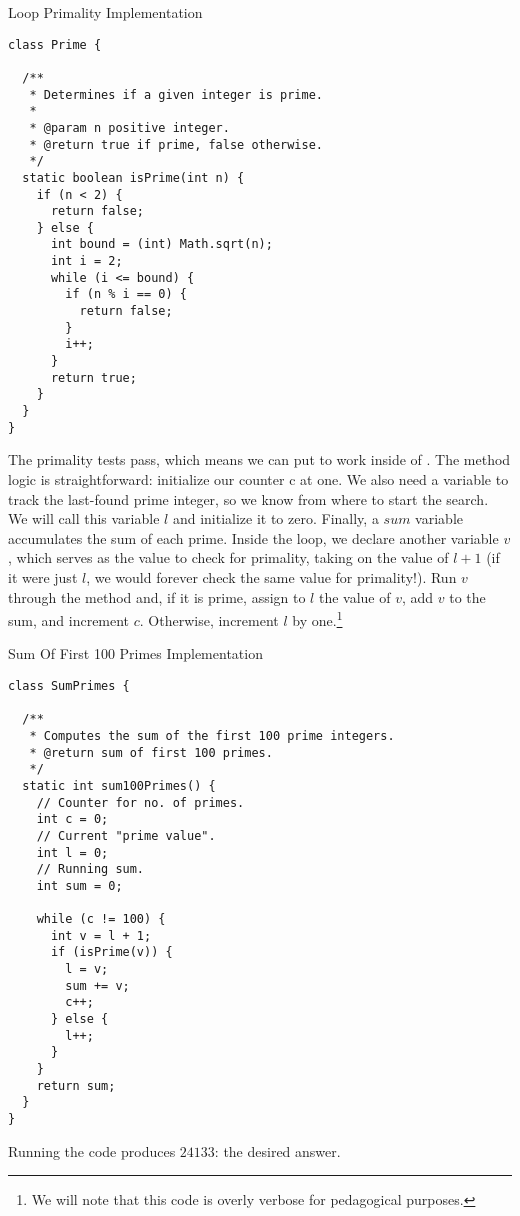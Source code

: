 \begin{cl}{Loop Primality Implementation}
\begin{lstlisting}[language=MyJava]
class Prime {

  /**
   * Determines if a given integer is prime.
   * 
   * @param n positive integer.
   * @return true if prime, false otherwise.
   */
  static boolean isPrime(int n) {
    if (n < 2) { 
      return false;
    } else {
      int bound = (int) Math.sqrt(n);
      int i = 2;
      while (i <= bound) {
        if (n % i == 0) {
          return false;
        }
        i++;
      }
      return true;
    }
  }
}
\end{lstlisting}
\end{cl}

The primality tests pass, which means we can put  to work inside of . The method logic is straightforward: initialize our counter c at one. We also need a variable to track the last-found prime integer, so we know from where to start the search. We will call this variable $l$ and initialize it to zero. Finally, a $\mathit{sum}$ variable accumulates the sum of each prime. Inside the loop, we declare another variable $v$, which serves as the value to check for primality, taking on the value of $l + 1$ (if it were just $l$, we would forever check the same value for primality!). Run $v$ through the  method and, if it is prime, assign to $l$ the value of $v$, add $v$ to the sum, and increment $c$. Otherwise, increment $l$ by one.\footnote{We will note that this code is overly verbose for pedagogical purposes.}

\begin{cl}{Sum Of First 100 Primes Implementation}
\begin{lstlisting}[language=MyJava]
class SumPrimes {

  /**
   * Computes the sum of the first 100 prime integers.
   * @return sum of first 100 primes.
   */
  static int sum100Primes() {
    // Counter for no. of primes.
    int c = 0;   
    // Current "prime value".
    int l = 0;   
    // Running sum.
    int sum = 0; 
    
    while (c != 100) {
      int v = l + 1;
      if (isPrime(v)) {
        l = v;
        sum += v;
        c++;
      } else {
        l++;
      }
    }
    return sum;
  }
}
\end{lstlisting}
\end{cl}

Running the code produces $24133$: the desired answer.

